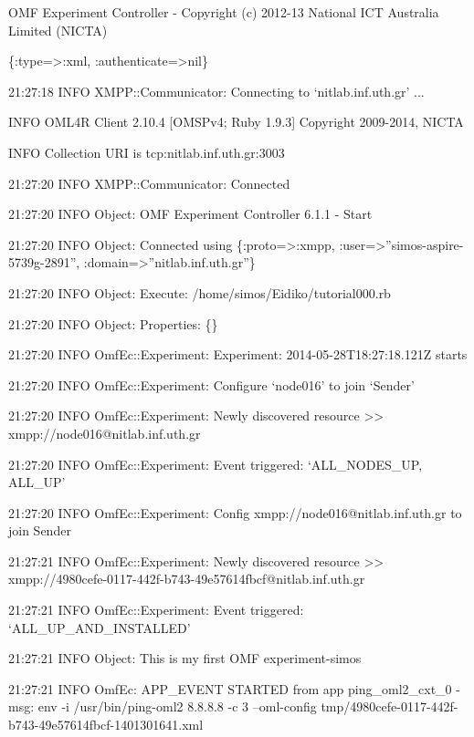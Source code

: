 \documentclass[letterpaper,10pt,english]{sphinxmanual}
\begin{document}
\begin{DUlineblock}{0em}
\item[] OMF Experiment Controller - Copyright (c) 2012-13 National ICT Australia Limited (NICTA)
\item[] \{:type=\textgreater{}:xml, :authenticate=\textgreater{}nil\}
\item[] 21:27:18 INFO  XMPP::Communicator: Connecting to `nitlab.inf.uth.gr' ...
\item[] INFO  OML4R Client 2.10.4 {[}OMSPv4; Ruby 1.9.3{]} Copyright 2009-2014, NICTA
\item[] INFO  Collection URI is tcp:nitlab.inf.uth.gr:3003
\item[] 21:27:20 INFO  XMPP::Communicator: Connected
\item[] 21:27:20 INFO  Object: OMF Experiment Controller 6.1.1 - Start
\item[] 21:27:20 INFO  Object: Connected using \{:proto=\textgreater{}:xmpp, :user=\textgreater{}''simos-aspire-5739g-2891'', :domain=\textgreater{}''nitlab.inf.uth.gr''\}
\item[] 21:27:20 INFO  Object: Execute: /home/simos/Eidiko/tutorial000.rb
\item[] 21:27:20 INFO  Object: Properties: \{\}
\item[] 21:27:20 INFO  OmfEc::Experiment: Experiment: 2014-05-28T18:27:18.121Z starts
\item[] 21:27:20 INFO  OmfEc::Experiment: Configure `node016' to join `Sender'
\item[] 21:27:20 INFO  OmfEc::Experiment: Newly discovered resource \textgreater{}\textgreater{} xmpp://node016@nitlab.inf.uth.gr
\item[] 21:27:20 INFO  OmfEc::Experiment: Event triggered: `ALL\_NODES\_UP, ALL\_UP'
\item[] 21:27:20 INFO  OmfEc::Experiment: Config xmpp://node016@nitlab.inf.uth.gr to join Sender
\item[] 21:27:21 INFO  OmfEc::Experiment: Newly discovered resource \textgreater{}\textgreater{} xmpp://4980cefe-0117-442f-b743-49e57614fbcf@nitlab.inf.uth.gr
\item[] 21:27:21 INFO  OmfEc::Experiment: Event triggered: `ALL\_UP\_AND\_INSTALLED'
\item[] 21:27:21 INFO  Object: This is my first OMF experiment-simos
\item[] 21:27:21 INFO  OmfEc: APP\_EVENT STARTED from app ping\_oml2\_cxt\_0 - msg: env -i /usr/bin/ping-oml2  8.8.8.8 -c 3 --oml-config tmp/4980cefe-0117-442f-b743-49e57614fbcf-1401301641.xml

\end{DUlineblock}
\end{document}

